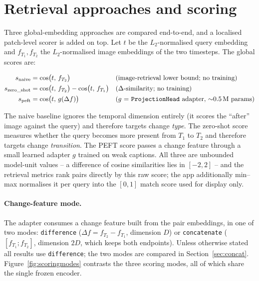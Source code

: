 \documentclass{article}
\begin{document}
\section{Retrieval approaches and scoring}
\label{sec:methods}

Three global-embedding approaches are compared end-to-end, and a localised
patch-level scorer is added on top. Let $t$ be the $L_2$-normalised query
embedding and $f_{T_1}, f_{T_2}$ the $L_2$-normalised image embeddings of the
two timesteps. The global scores are:

\begin{align}
    s_{\text{naive}}     &= \cos\!\big(t,\, f_{T_2}\big) && \text{(image-retrieval lower bound; no training)} \\
    s_{\text{zero\_shot}} &= \cos\!\big(t,\, f_{T_2}\big) - \cos\!\big(t,\, f_{T_1}\big) && \text{($\Delta$-similarity; no training)} \\
    s_{\text{peft}}      &= \cos\!\big(t,\, g(\Delta f)\big) && \text{($g$ = \texttt{ProjectionHead} adapter, $\sim$0.5\,M params)}
\end{align}

The naive baseline ignores the temporal dimension entirely (it scores the
``after'' image against the query) and therefore targets change \emph{type}. The
zero-shot score measures whether the query becomes more present from $T_1$ to
$T_2$ and therefore targets change \emph{transition}. The PEFT score passes a
change feature through a small learned adapter $g$ trained on weak captions.
All three are unbounded model-unit values -- a difference of cosine similarities
lies in $[-2, 2]$ -- and the retrieval metrics rank pairs directly by this raw
score; the app additionally min--max normalises it per query into the $[0,1]$
match score used for display only.

\paragraph{Change-feature mode.}
The adapter consumes a change feature built from the pair embeddings, in one of
two modes: \texttt{difference}
($\Delta f = f_{T_2} - f_{T_1}$, dimension $D$) or \texttt{concatenate}
($[f_{T_1} ; f_{T_2}]$, dimension $2D$, which keeps both endpoints). Unless
otherwise stated all results use \texttt{difference}; the two modes are compared
in Section~\ref{sec:concat}. Figure~\ref{fig:scoringmodes} contrasts the three
scoring modes, all of which share the single frozen encoder.
\end{document}
